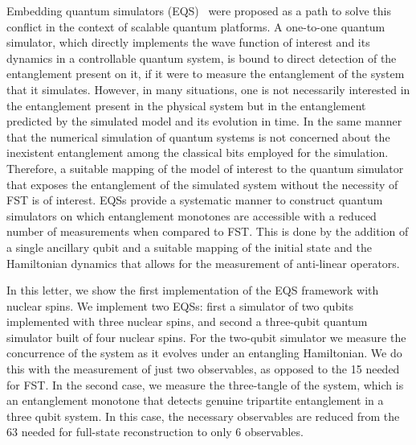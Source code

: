 \documentclass[10pt,nofootinbib,notitlepage,twocolumn,superscriptaddress]{revtex4-1}
\theoremstyle{plain}
\theoremstyle{definition}
\begin{document}
Embedding quantum simulators (EQS)~\cite{Candia,Loredo} were proposed as a path to solve this conflict in the context of scalable quantum platforms. A one-to-one quantum simulator, which directly implements the wave function of interest and its dynamics in a controllable quantum system, is bound to direct detection of the entanglement present on it, if it were to measure the entanglement of the system that it simulates. However, in many situations, one is not necessarily  interested in the entanglement present in the physical system but in the entanglement predicted by the simulated model and its evolution in time. In the same manner that the numerical simulation of quantum systems is not concerned about the inexistent entanglement among the classical bits employed for the simulation. Therefore, a suitable mapping of the model of interest to the quantum simulator that exposes the entanglement of the simulated system without the necessity of FST is of interest.  EQSs provide a systematic manner to construct quantum simulators on which entanglement monotones are accessible with a reduced number of measurements when compared to FST. This is done by the addition of a single ancillary qubit and a suitable mapping of the initial state and the Hamiltonian dynamics that allows for the measurement of anti-linear operators. 

In this letter, we show the first implementation of the EQS framework with nuclear spins. We implement two EQSs: first a simulator of two qubits implemented with three nuclear spins, and second a three-qubit quantum simulator built of four nuclear spins. For the two-qubit simulator we measure the concurrence of the system as it evolves under an entangling Hamiltonian. We do this with the measurement of just two observables, as opposed to the 15 needed for FST. In the second case, we measure the three-tangle of the system, which is an entanglement monotone that detects  genuine tripartite entanglement in a three qubit system. In this case, the necessary observables are reduced from the 63 needed for full-state reconstruction to only 6 observables. 
\\
\end{document}
